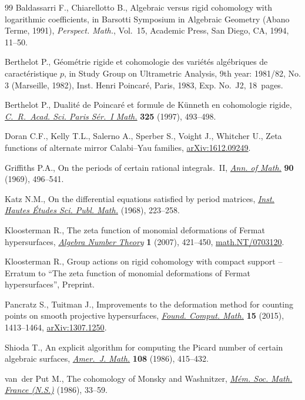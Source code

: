 \documentclass[11pt]{article}
\numberwithin{equation}{section}
\begin{document}
\begin{thebibliography}{99}
Baldassarri F., Chiarellotto B., Algebraic versus rigid cohomology with
 logarithmic coef\/f\/icients, in Barsotti {S}ymposium in {A}lgebraic {G}eometry
 ({A}bano {T}erme, 1991), \textit{Perspect. Math.}, Vol.~15, Academic Press,
 San Diego, CA, 1994, 11--50.

Berthelot P., G\'eom\'etrie rigide et cohomologie des vari\'et\'es
 alg\'ebriques de caract\'eristique {$p$}, in Study Group on Ultrametric
 Analysis, 9th year: 1981/82, {N}o. 3 ({M}arseille, 1982), Inst. Henri
 Poincar\'e, Paris, 1983, Exp. No.~J2, 18~pages.

Berthelot P., Dualit\'e de {P}oincar\'e et formule de {K}\"unneth en
 cohomologie rigide, \href{https://doi.org/10.1016/S0764-4442(97)88895-7}{\textit{C.~R.~Acad. Sci. Paris S\'er.~I Math.}}
 \textbf{325} (1997), 493--498.

Doran C.F., Kelly T.L., Salerno A., Sperber S., Voight J., Whitcher U., Zeta
 functions of alternate mirror {C}alabi--{Y}au families, \href{https://arxiv.org/abs/1612.09249}{arXiv:1612.09249}.

Grif\/f\/iths P.A., On the periods of certain rational integrals.~{II},
 \href{https://doi.org/10.2307/1970747}{\textit{Ann. of Math.}} \textbf{90} (1969), 496--541.

Katz N.M., On the dif\/ferential equations satisf\/ied by period matrices,
 \href{https://doi.org/10.1007/BF02698924}{\textit{Inst. Hautes \'Etudes Sci. Publ. Math.}} (1968), 223--258.

Kloosterman R., The zeta function of monomial deformations of {F}ermat
 hypersurfaces, \href{https://doi.org/10.2140/ant.2007.1.421}{\textit{Algebra Number Theory}} \textbf{1} (2007), 421--450,
 \href{https://arxiv.org/abs/math.NT/0703120}{math.NT/0703120}.

Kloosterman R., Group actions on rigid cohomology with compact support --
 {E}rratum to ``The zeta function of monomial deformations of {F}ermat
 hypersurfaces'', {P}reprint.

Pancratz S., Tuitman J., Improvements to the deformation method for counting
 points on smooth projective hypersurfaces, \href{https://doi.org/10.1007/s10208-014-9242-8}{\textit{Found. Comput. Math.}}
 \textbf{15} (2015), 1413--1464, \href{https://arxiv.org/abs/1307.1250}{arXiv:1307.1250}.

Shioda T., An explicit algorithm for computing the {P}icard number of certain
 algebraic surfaces, \href{https://doi.org/10.2307/2374678}{\textit{Amer.~J. Math.}} \textbf{108} (1986), 415--432.

van~der Put M., The cohomology of {M}onsky and {W}ashnitzer, \href{https://doi.org/10.24033/msmf.324}{\textit{M\'em.
 Soc. Math. France (N.S.)}} (1986), 33--59.

\end{thebibliography}
\end{document}
